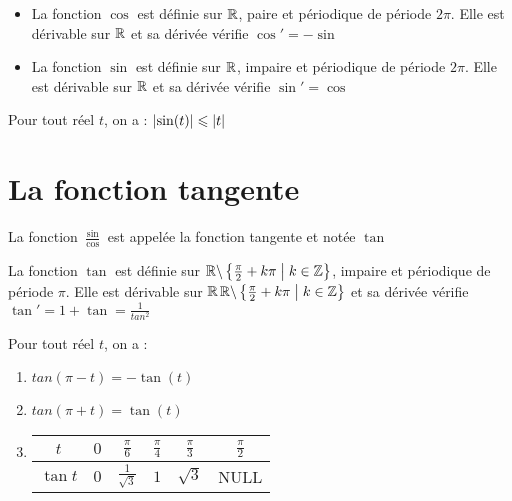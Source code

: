 \begin{prop}
	\begin{itemize}
		\item La fonction \(\cos\) est définie sur \(\mathbb{R}\), paire et périodique de période \(2\pi\). Elle est dérivable sur \(\mathbb{R}\) et sa dérivée vérifie \(\cos' = -\sin\)
		\item La fonction \(\sin\) est définie sur \(\mathbb{R}\), impaire et périodique de période \(2\pi\). Elle est dérivable sur \(\mathbb{R}\) et sa dérivée vérifie \(\sin' = \cos\)
	\end{itemize}
\end{prop}

\begin{prop}
	Pour tout réel \(t\), on a : \(\left\lvert\sin(t)\right\rvert \leqslant \left\lvert t\right\rvert\)
\end{prop}

\section{La fonction tangente}
\begin{defi}
	La fonction \(\frac{\sin}{\cos} \) est appelée la fonction tangente et notée \(\tan\)
\end{defi}

\begin{prop}
	La fonction \(\tan\) est définie sur \(\mathbb{R}\backslash\left\lbrace\frac{\pi}{2}+k\pi\;\middle|\; k\in \mathbb{Z}\right\rbrace\), impaire et périodique de période \(\pi\). Elle est dérivable sur \(\mathbb{R}\)\(\mathbb{R}\backslash\left\lbrace\frac{\pi}{2}+k\pi\;\middle|\; k\in \mathbb{Z}\right\rbrace\) et sa dérivée vérifie \(\tan' = 1+\tan = \frac{1}{tan^2}\)
\end{prop}

\begin{formu}
	Pour tout réel \(t\), on a :
	\begin{enumerate}
        \item \(tan(\pi-t) = -\tan(t)\)
        \item \(tan(\pi+t) = \tan(t) \)
        \item \begin{tabular}{|c|c|c|c|c|c|}

		\hline
		\(t\)       & \(0\) & \(\frac{\pi}{6}\)      & \(\frac{\pi}{4}\)      & \(\frac{\pi}{3}\)       & \(\frac{\pi}{2}\) \\
		\hline
		\(\tan t \) & \(0\) & \(\frac{1}{\sqrt{3}}\) & \(1\) & \(\sqrt{3}\)       & NULL             \\
		\hline
	\end{tabular}
    \end{enumerate}
\end{formu}

